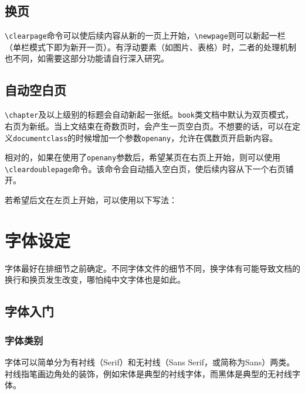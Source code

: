\documentclass[10pt,openany]{book}
\begin{document}


\section{换页}

\texttt{\textbackslash{}clearpage}命令可以使后续内容从新的一页上开始，\texttt{\textbackslash{}newpage}则可以新起一栏（单栏模式下即为新开一页）。有浮动要素（如图片、表格）时，二者的处理机制也不同，如需要这部分功能请自行深入研究。

\section{自动空白页}

\texttt{\textbackslash{}chapter}及以上级别的标题会自动新起一张纸。\texttt{book}类文档中默认为双页模式，右页为新纸。当上文结束在奇数页时，会产生一页空白页。不想要的话，可以在定义\texttt{documentclass}的时候增加一个参数\texttt{openany}，允许在偶数页开启新内容。



相对的，如果在使用了\texttt{openany}参数后，希望某页在右页上开始，则可以使用\texttt{\textbackslash{}cleardoublepage}命令。该命令会自动插入空白页，使后续内容从下一个右页铺开。

若希望后文在左页上开始，可以使用以下写法：



\chapter{字体设定}

字体最好在排细节之前确定。不同字体文件的细节不同，换字体有可能导致文档的换行和换页发生改变，哪怕纯中文字体也是如此。

\section{字体入门}

\subsection{字体类别}

字体可以简单分为有衬线（Serif）和无衬线（Sans Serif，或简称为Sans）两类。衬线指笔画边角处的装饰，例如宋体是典型的衬线字体，而黑体是典型的无衬线字体。
\end{document}
